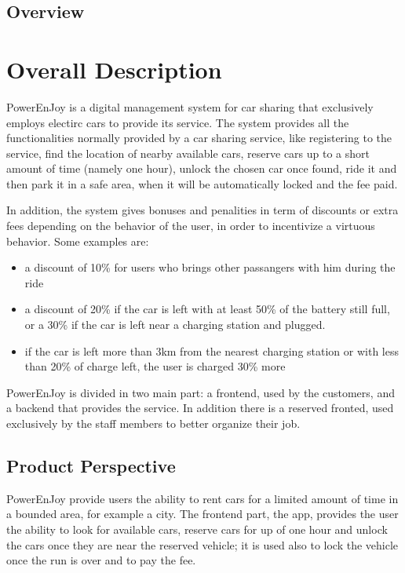 \documentclass[11pt]{article} %
\newcommand{\pe}{PowerEnJoy }
\begin{document}
\subsection{Overview}

\section{Overall Description}

\pe is a digital management system for car sharing that exclusively employs electirc cars to provide its service. The system provides all the functionalities normally provided by a car sharing service, like registering to the service, find the location of nearby available cars, reserve cars up to a short amount of time (namely one hour), unlock the chosen car once found, ride it and then park it in a safe area, when it will be automatically locked and the fee paid.

In addition, the system gives bonuses and penalities in term of discounts or extra fees depending on the behavior of the user, in order to incentivize a virtuous behavior. Some examples are:

\begin{itemize}
	\item a discount of 10\% for users who brings other passangers with him during the ride
	\item a discount of 20\% if the car is left with at least 50\% of the battery still full, or a 30\% if the car is left near a charging station and plugged.
	\item if the car is left more than 3km from the nearest charging station or with less than 20\% of charge left, the user is charged 30\% more
\end{itemize}

\pe is divided in two main part: a frontend, used by the customers, and a backend that provides the service. In addition there is a reserved fronted, used exclusively by the staff members to better organize their job.


\subsection{Product Perspective}
  
  \pe provide users the ability to rent cars for a limited amount of time in a bounded area, for example a city. 
  The frontend part, the app, provides the user the ability to look for available cars, reserve cars for up of one hour and unlock the cars once they are near the reserved vehicle; it is used also to lock the vehicle once the run is over and to pay the fee.
\end{document}
